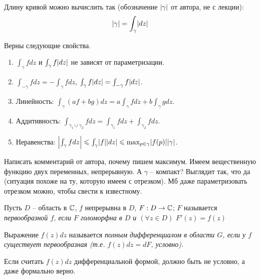 \begin{note}
	Длину кривой можно вычислить так (обозначение $\mathopen{}\left\lvert\gamma\right\rvert\mathclose{}$ от автора, не с лекции):
	\[
		\mathopen{}\left\lvert\gamma\right\rvert\mathclose{} = \int_\gamma \mathopen{}\left\lvert dz\right\rvert\mathclose{}
	\]
\end{note}
\begin{theorem}
	Верны следующие свойства.
	\begin{enumerate}
		\item $\int_\gamma f dz$ и $\int_\gamma f \mathopen{}\left\lvert dz\right\rvert\mathclose{}$ не зависят от параметризации.
		\item $\int_{-\gamma} f dz = - \int_{\gamma} f dz$, $\int_\gamma f \mathopen{}\left\lvert dz\right\rvert\mathclose{} = \int_{-\gamma} f \mathopen{}\left\lvert dz\right\rvert\mathclose{}$.
		\item Линейность: $\int_\gamma (af + bg) dz = a \int_\gamma f dz + b \int_\gamma g dz$.
		\item Аддитивность: $\int_{\gamma_1 \cup \gamma_2} f dz = \int_{\gamma_1} f dz + \int_{\gamma_2} f dz$.
		\item Неравенства: $\mathopen{}\left\lvert\int_\gamma f dz\right\rvert\mathclose{} \leqslant \int_\gamma \mathopen{}\left\lvert f\right\rvert\mathclose{} \mathopen{}\left\lvert dz\right\rvert\mathclose{} \leqslant \max_{p \in \gamma} \mathopen{}\left\lvert f(p)\right\rvert\mathclose{} \mathopen{}\left\lvert\gamma\right\rvert\mathclose{}$.
	\end{enumerate}
\end{theorem}
{\color{red} Написать комментарий от автора, почему пишем максимум. Имеем вещественную функцию двух переменных, непрерывную. А $\gamma$ -- компакт? Выглядит так, что да (ситуация похоже на ту, которую имеем с отрезком). Мб даже параметризовать отрезком можно, чтобы свести к известному.}

\begin{definition}
	Пусть $D$ -- область в $\mathbb{C}$, $f$ непрерывна в $D$, $F: D \to \mathbb{C}$; $F$ называется \it{первообразной} $f$, если $F$ голоморфна в $D$ и $(\forall z \in D) \,\, F'(z) = f(z)$
\end{definition}

\begin{definition}
	Выражение $f(z) dz$ называется \it{полным дифференциалом в области $G$}, если у $f$ существует первообразная (т.е. $f(z) dz = dF$, условно).
\end{definition}
\begin{anote}
	Если считать $f(z) dz$ дифференциальной формой, должно быть не условно, а даже формально верно.
\end{anote}

